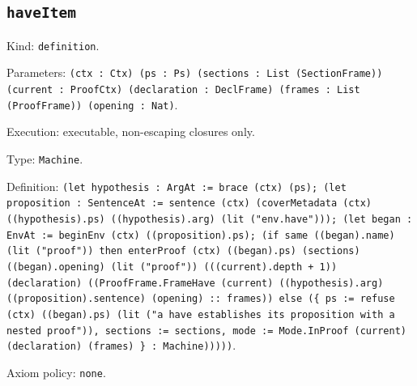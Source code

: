 \documentclass[11pt]{article}
\begin{document}
\subsection*{\texttt{haveItem}}
\noindent Kind: \texttt{definition}.\par
\noindent Parameters: \texttt{(ctx : Ctx) (ps : Ps) (sections : List (SectionFrame)) (current : ProofCtx) (declaration : DeclFrame) (frames : List (ProofFrame)) (opening : Nat)}.\par
\noindent Execution: executable, non-escaping closures only.\par
\noindent Type: \texttt{Machine}.\par
\noindent Definition: \texttt{(let hypothesis : ArgAt := brace (ctx) (ps); (let proposition : SentenceAt := sentence (ctx) (coverMetadata (ctx) ((hypothesis).ps) ((hypothesis).arg) (lit ("env.have"))); (let began : EnvAt := beginEnv (ctx) ((proposition).ps); (if same ((began).name) (lit ("proof")) then enterProof (ctx) ((began).ps) (sections) ((began).opening) (lit ("proof")) (((current).depth + 1)) (declaration) ((ProofFrame.FrameHave (current) ((hypothesis).arg) ((proposition).sentence) (opening) :: frames)) else (\{ ps := refuse (ctx) ((began).ps) (lit ("a have establishes its proposition with a nested proof")), sections := sections, mode := Mode.InProof (current) (declaration) (frames) \} : Machine)))))}.\par
\noindent Axiom policy: \texttt{none}.\par
\end{document}
